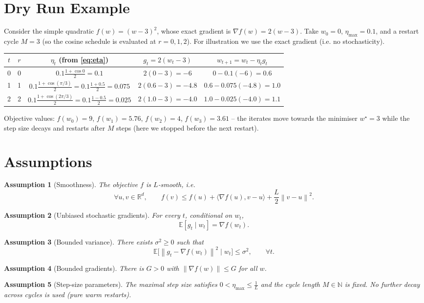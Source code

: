 \documentclass[11pt]{article}
\newtheorem{assumption}{Assumption}
\newcommand{\E}{\mathbb{E}}
\newcommand{\R}{\mathbb{R}}
\newcommand{\norm}[1]{\left\lVert #1 \right\rVert}
\newcommand{\ip}[2]{\langle #1,#2\rangle}
\begin{document}
\section*{Dry Run Example}
Consider the simple quadratic $f(w)=(w-3)^2$, whose exact gradient is
$\nabla f(w)=2(w-3)$.  
Take $w_0=0$, $\eta_{\max}=0.1$, and a restart cycle $M=3$ (so the cosine
schedule is evaluated at $r=0,1,2$).  For illustration we use the exact gradient
(i.e. no stochasticity).

\begin{center}
\begin{tabular}{c|c|c|c|c}
$t$ & $r$ & $\eta_t$ (from \eqref{eq:eta}) & $g_t=2(w_t-3)$ & $w_{t+1}=w_t-\eta_t g_t$ \\ \hline
0 & 0 & $0.1\frac{1+\cos0}{2}=0.1$ & $2(0-3)=-6$ & $0-0.1(-6)=0.6$ \\
1 & 1 & $0.1\frac{1+\cos(\pi/3)}{2}=0.1\frac{1+0.5}{2}=0.075$ & $2(0.6-3)=-4.8$ & $0.6-0.075(-4.8)=1.0$ \\
2 & 2 & $0.1\frac{1+\cos(2\pi/3)}{2}=0.1\frac{1-0.5}{2}=0.025$ & $2(1.0-3)=-4.0$ & $1.0-0.025(-4.0)=1.1$
\end{tabular}
\end{center}
Objective values: $f(w_0)=9$, $f(w_1)=5.76$, $f(w_2)=4$, $f(w_3)=3.61$ – the iterates move
towards the minimiser $w^\star=3$ while the step size decays and restarts
after $M$ steps (here we stopped before the next restart).

\newpage
\section*{Assumptions}
\begin{assumption}[Smoothness]\label{ass:smooth}
The objective $f$ is $L$‑smooth, i.e.
\[
\forall u,v\in\R^d,\qquad 
f(v)\le f(u)+\ip{\nabla f(u)}{v-u}+\frac{L}{2}\norm{v-u}^2 .
\]
\end{assumption}
\begin{assumption}[Unbiased stochastic gradients]\label{ass:unbiased}
For every $t$, conditional on $w_t$,
\[
\E[g_t\mid w_t]=\nabla f(w_t).
\]
\end{assumption}
\begin{assumption}[Bounded variance]\label{ass:variance}
There exists $\sigma^2\ge0$ such that
\[
\E\bigl[\norm{g_t-\nabla f(w_t)}^2\mid w_t\bigr]\le\sigma^2,
\qquad\forall t .
\]
\end{assumption}
\begin{assumption}[Bounded gradients]\label{ass:bound}
There is $G>0$ with $\norm{\nabla f(w)}\le G$ for all $w$.
\end{assumption}
\begin{assumption}[Step‑size parameters]\label{ass:steps}
The maximal step size satisfies $0<\eta_{\max}\le \frac{1}{L}$ and the cycle length
$M\in\mathbb N$ is fixed. No further decay across cycles is used (pure warm restarts).
\end{assumption}
\end{document}
